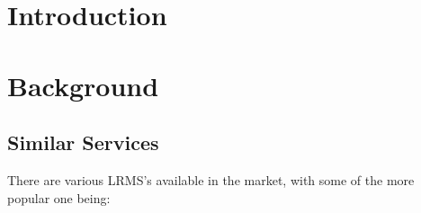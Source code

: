 \documentclass[12pt, a4paper,twoside]{report}
\theoremstyle{plain} %
\theoremstyle{definition} %
\numberwithin{equation}{chapter}
\begin{document}

\tableofcontents

\chapter{Introduction}\label{ch:introduction}


\chapter{Background}\label{ch:background}

\section{Similar Services}\label{sec:similarservices}

There are various LRMS's available in the market, with some of the more popular
one being:
\end{document}
